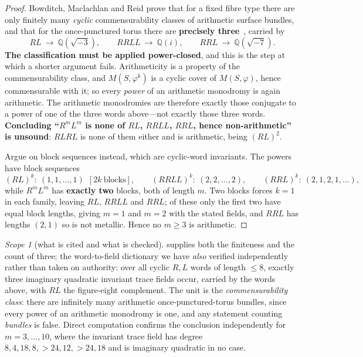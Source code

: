\documentclass[11pt,reqno]{amsart}
\theoremstyle{plain}
\theoremstyle{definition}
\theoremstyle{remark}
\newtheorem{scope}[theorem]{Scope}
\newcommand{\Q}{\mathbb{Q}}
\begin{document}
\begin{proof}
Bowditch, Maclachlan and Reid prove that for a fixed fibre type there are only finitely
many \emph{cyclic} commensurability classes of arithmetic surface bundles, and that for
the once-punctured torus there are \textbf{precisely three}~\cite{BMR}, carried by
\[
   RL\ \to\ \Q(\sqrt{-3}),\qquad RRLL\ \to\ \Q(i),\qquad RRL\ \to\ \Q(\sqrt{-7}).
\]
\textbf{The classification must be applied power-closed}, and this is the step at which a
shorter argument fails. Arithmeticity is a property of the commensurability class, and
$M(S,\varphi^k)$ is a cyclic cover of $M(S,\varphi)$, hence commensurable with it; so
every \emph{power} of an arithmetic monodromy is again arithmetic. The arithmetic
monodromies are therefore exactly those conjugate to a power of one of the three words
above---not exactly those three words. \textbf{Concluding ``$R^mL^m$ is none of $RL$,
$RRLL$, $RRL$, hence non-arithmetic'' is unsound}: $RLRL$ is none of them either and is
arithmetic, being $(RL)^2$.

Argue on block sequences instead, which are cyclic-word invariants. The powers have
block sequences
\[
   (RL)^k:\ (1,1,\dots,1)\ \ [2k\ \text{blocks}],\qquad
   (RRLL)^k:\ (2,2,\dots,2),\qquad
   (RRL)^k:\ (2,1,2,1,\dots),
\]
while $R^mL^m$ has \textbf{exactly two} blocks, both of length $m$. Two blocks forces
$k=1$ in each family, leaving $RL$, $RRLL$ and $RRL$; of these only the first two have
equal block lengths, giving $m=1$ and $m=2$ with the stated fields, and $RRL$ has
lengths $(2,1)$ so is not metallic. Hence no $m\ge3$ is arithmetic.
\end{proof}

\begin{scope}[what is cited and what is checked]\label{sc:bmr}
\cite{BMR} supplies both the finiteness and the count of three; the word-to-field
dictionary we have \emph{also} verified independently rather than taken on authority: over all cyclic $R,L$ words of length $\le8$,
exactly three imaginary quadratic invariant trace fields occur, carried by the words
above, with $RL$ the figure-eight complement. The unit is the \emph{commensurability
class}: there are infinitely many arithmetic once-punctured-torus bundles, since every
power of an arithmetic monodromy is one, and any statement counting \emph{bundles} is
false. Direct computation confirms the conclusion independently for $m=3,\dots,10$,
where the invariant trace field has degree $8,4,18,8,>24,12,>24,18$ and is imaginary
quadratic in no case.
\end{scope}
\end{document}
